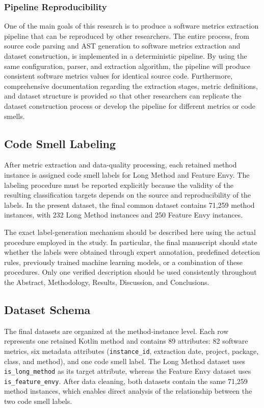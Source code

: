 \documentclass[]{einformatica}
\begin{document}
\subsubsection{Pipeline Reproducibility}

One of the main goals of this research is to produce a software metrics extraction pipeline that can be reproduced by other researchers. The entire process, from source code parsing and AST generation to software metrics extraction and dataset construction, is implemented in a deterministic pipeline. By using the same configuration, parser, and extraction algorithm, the pipeline will produce consistent software metrics values ​​for identical source code. Furthermore, comprehensive documentation regarding the extraction stages, metric definitions, and dataset structure is provided so that other researchers can replicate the dataset construction process or develop the pipeline for different metrics or code smells.

\subsection{Code Smell Labeling}

After metric extraction and data-quality processing, each retained method instance is assigned code smell labels for Long Method and Feature Envy. The labeling procedure must be reported explicitly because the validity of the resulting classification targets depends on the source and reproducibility of the labels. In the present dataset, the final common dataset contains 71,259 method instances, with 232 Long Method instances and 250 Feature Envy instances.

The exact label-generation mechanism should be described here using the actual procedure employed in the study. In particular, the final manuscript should state whether the labels were obtained through expert annotation, predefined detection rules, previously trained machine learning models, or a combination of these procedures. Only one verified description should be used consistently throughout the Abstract, Methodology, Results, Discussion, and Conclusions.

\subsection{Dataset Schema}

The final datasets are organized at the method-instance level. Each row represents one retained Kotlin method and contains 89 attributes: 82 software metrics, six metadata attributes (\texttt{instance\_id}, extraction date, project, package, class, and method), and one code smell label. The Long Method dataset uses \texttt{is\_long\_method} as its target attribute, whereas the Feature Envy dataset uses \texttt{is\_feature\_envy}. After data cleaning, both datasets contain the same 71,259 method instances, which enables direct analysis of the relationship between the two code smell labels.
\end{document}
